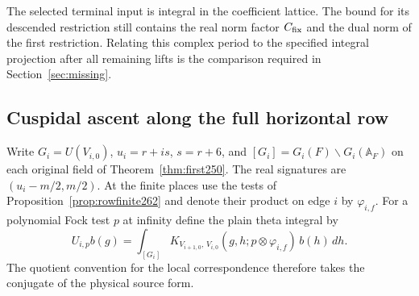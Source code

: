 \documentclass[a4paper,11pt]{article}
\theoremstyle{definition}
\theoremstyle{remark}
\numberwithin{equation}{section}
\begin{document}
The selected terminal input is integral in the coefficient
lattice. The bound for its descended restriction still contains
the real norm factor \(C_{\rm fix}\) and the dual norm of the
first restriction. Relating this complex period to the specified
integral projection after all remaining lifts is the comparison
required in Section~\ref{sec:missing}.

\subsection{Cuspidal ascent along the full horizontal row}\label{nav:V-38}
Write \(G_i=U(V_{i,0})\), \(u_i=r+is\), \(s=r+6\), and
\([G_i]=G_i(F)\backslash G_i(\mathbb A_F)\) on each original
field of Theorem~\ref{thm:first250}. The real signatures are
\((u_i-m/2,m/2)\). At the finite places use the tests of
Proposition~\ref{prop:rowfinite262} and denote their product
on edge \(i\) by \(\varphi_{i,f}\). For a polynomial Fock test
\(p\) at infinity define the plain theta integral by
\[
 U_{i,p}b(g)=\int_{[G_i]}
       K_{V_{i+1,0},\,V_{i,0}}(g,h;p\otimes\varphi_{i,f})\,b(h)\,dh .
\]
The quotient convention for the local correspondence therefore
takes the conjugate of the physical source form.
\end{document}

